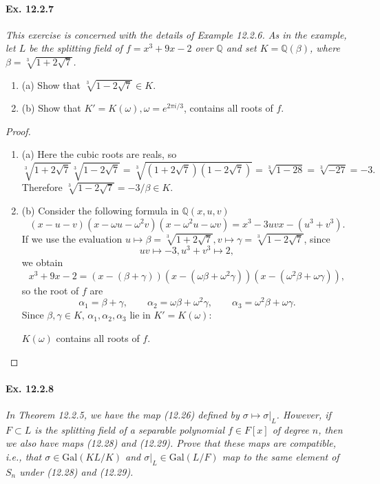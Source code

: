 \documentclass[11pt,a4paper]{article}
\newcommand{\be} {\begin{enumerate}}
\newcommand{\ee} {\end{enumerate}}
\newcommand{\Q}{\mathbb{Q}}
\newcommand{\Gal}{\mathrm{Gal}}
\begin{document}
\paragraph{Ex. 12.2.7}

{\it This exercise is concerned with the details of Example 12.2.6. As in the example, let $L$ be the splitting field of $f = x^3 + 9x -2$ over $\Q$ and set $K = \Q(\beta)$, where $\beta = \sqrt[3]{1 + 2 \sqrt{7}}$.
\be
\item[(a)] Show that $\sqrt[3]{1 - 2 \sqrt{7}} \in K$.
\item[(b)] Show that $K' = K(\omega), \omega = e^{2\pi i/3}$, contains all roots of $f$.
\ee
}

\begin{proof}
\be
\item [(a)] 
Here the cubic roots are reals, so
$$\sqrt[3]{1 + 2 \sqrt{7}} \sqrt[3]{1 - 2 \sqrt{7}} = \sqrt[3]{(1 + 2 \sqrt{7})(1 -2 \sqrt{7})} = \sqrt[3]{ 1 -28} = \sqrt[3]{-27} = -3.$$
Therefore $\sqrt[3]{1 - 2 \sqrt{7}}  = -3/\beta \in K$.

\item[(b)] Consider the following formula in $\Q(x,u,v)$
$$
(x-u-v)(x-\omega u - \omega^2v)(x - \omega^2u - \omega v) = x^3 - 3uv x - (u^3 + v^3).
$$
If we use the evaluation $u \mapsto \beta = \sqrt[3]{1 + 2 \sqrt{7}}, v \mapsto \gamma = \sqrt[3]{1 - 2 \sqrt{7}}$, since
$$uv \mapsto -3, u^3 + v^3 \mapsto  2,$$
we obtain
$$x^3+ 9 x - 2 = (x - (\beta + \gamma))(x -( \omega \beta + \omega^2 \gamma))(x - (\omega^2 \beta + \omega \gamma)),$$
so the root of $f$ are 
$$\alpha_1 = \beta + \gamma,\qquad  \alpha_2 = \omega \beta + \omega^2 \gamma,\qquad  \alpha_3 = \omega^2 \beta + \omega \gamma.$$
Since $\beta, \gamma \in K$, $\alpha_1,\alpha_2,\alpha_3$ lie in $K' = K(\omega)$:
\begin{center}
$K(\omega)$ contains all roots of $f$.
\end{center}
\ee
\end{proof}

\paragraph{Ex. 12.2.8}

{\it In Theorem 12.2.5, we have the map (12.26) defined by $\sigma \mapsto \sigma|_L$. However, if $F \subset L$ is the splitting field of a separable polynomial $f \in F[x]$ of degree $n$, then we also have maps (12.28) and (12.29). Prove that these maps are compatible, i.e., that $\sigma \in \Gal(KL/K)$ and $\sigma|_L \in \Gal(L/F)$ map to the same element of $S_n$ under (12.28) and (12.29).
}
\end{document}

